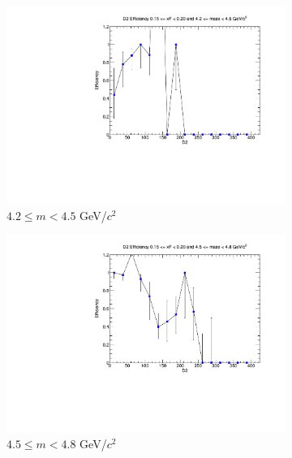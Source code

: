 \begin{figure}[p]
    \centering
    \begin{subfigure}[b]{0.32\textwidth}
        \centering
        \includegraphics[width=\textwidth]{./kTrackerEfficiencyPlots/D2_Efficiency_xF3_mass0.pdf}
        \caption{$4.2 \leq m < 4.5$ GeV/$c^2$}
        \label{fig:xF3_mass0}
    \end{subfigure}
    \hfill
    \begin{subfigure}[b]{0.32\textwidth}
        \centering
        \includegraphics[width=\textwidth]{./kTrackerEfficiencyPlots/D2_Efficiency_xF3_mass1.pdf}
        \caption{$4.5 \leq m < 4.8$ GeV/$c^2$}
        \label{fig:xF3_mass1}
    \end{subfigure}
    \hfill
    \begin{subfigure}[b]{0.32\textwidth}

\end{subfigure}
\end{figure}
